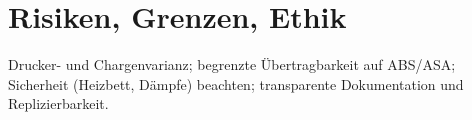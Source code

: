 \chapter{Risiken, Grenzen, Ethik}
\label{cha:Risiken, Grenzen, Ethik}

Drucker- und Chargenvarianz; begrenzte Übertragbarkeit auf ABS/ASA; Sicherheit (Heizbett, Dämpfe) beachten; transparente Dokumentation und Replizierbarkeit.